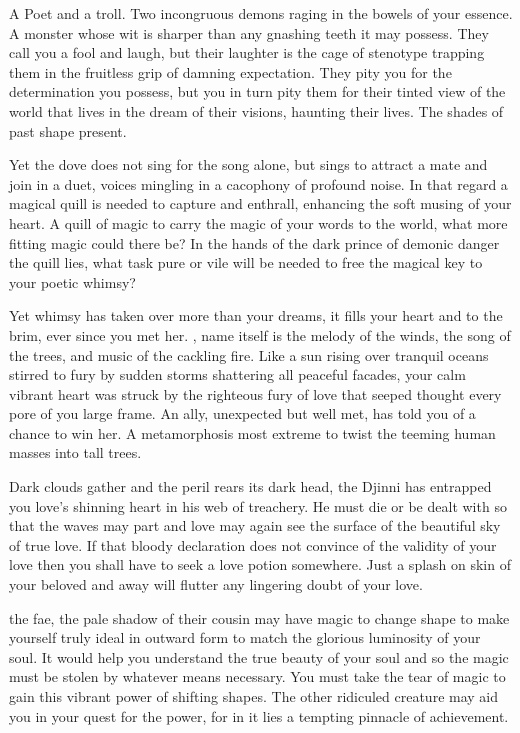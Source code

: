 \documentclass[char]{guildcamp2}
\begin{document}
\name{\cTroll{}}




A Poet and a troll. Two incongruous demons raging in the bowels of your essence. A monster whose wit is sharper than any gnashing teeth it may possess. They call you a fool and laugh, but their laughter is the cage of stenotype trapping them in the fruitless grip of damning expectation. They pity you for the determination you possess, but you in turn pity them for their tinted view of the world that lives in the dream of their visions, haunting their lives. The shades of past shape present. 

Yet the dove does not sing for the song alone, but sings to attract a mate and join in a duet, voices mingling in a cacophony of profound noise. In that regard a magical quill is needed to capture and enthrall, enhancing the soft musing of your heart. A quill of magic to carry the magic of your words to the world, what more fitting magic could there be? In the hands of the dark prince of demonic danger \cDemon{} the quill lies, what task pure or vile will be needed to free the magical key to your poetic whimsy? 

Yet whimsy has taken over more than your dreams, it fills your heart and to the brim, ever since you met her. \cTreeFae{}, \cTreeFae{\their} name itself is the melody of the winds, the song of the trees, and music of the cackling fire. Like a sun rising over tranquil oceans stirred to fury by sudden storms shattering all peaceful facades, your calm vibrant heart was struck by the righteous fury of love that seeped thought every pore of you large frame. An ally, unexpected but well met, has told you of a chance to win her. A metamorphosis most extreme to twist the teeming human masses into tall trees.

Dark clouds gather and the peril rears its dark head, the Djinni \cWizard{} has entrapped you love's shinning heart in his web of treachery. He must die or be dealt with so that the waves may part and love may again see the surface of the beautiful sky of true love. If that bloody declaration does not convince \cTreeFae{} of the validity of your love then you shall have to seek a love potion somewhere. Just a splash on skin of your beloved and away will flutter any lingering doubt of your love. 

\cBabyFae{} the fae, the pale shadow of their cousin \cTreeFae{} may have magic to change shape to make yourself truly ideal in outward form to match the glorious luminosity of your soul. It would help you understand the true beauty of your soul and so the magic must be stolen by whatever means necessary. You must take the tear of magic to gain this vibrant power of shifting shapes. The other ridiculed creature may aid you in your quest for the power, for in it lies a tempting pinnacle of achievement. 
\end{document}
